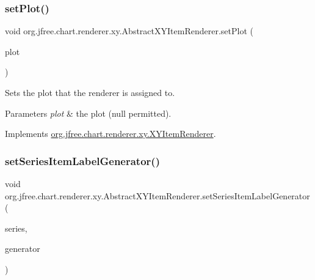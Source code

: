 \subsubsection{\texorpdfstring{set\+Plot()}{setPlot()}}
{\footnotesize\ttfamily void org.\+jfree.\+chart.\+renderer.\+xy.\+Abstract\+X\+Y\+Item\+Renderer.\+set\+Plot (\begin{DoxyParamCaption}\item[{\mbox{\hyperlink{classorg_1_1jfree_1_1chart_1_1plot_1_1_x_y_plot}{X\+Y\+Plot}}}]{plot }\end{DoxyParamCaption})}

Sets the plot that the renderer is assigned to.


\begin{DoxyParams}{Parameters}
{\em plot} & the plot ({\ttfamily null} permitted). \\
\hline
\end{DoxyParams}


Implements \mbox{\hyperlink{interfaceorg_1_1jfree_1_1chart_1_1renderer_1_1xy_1_1_x_y_item_renderer_a731979b292728dcb13c9041df3f713f5}{org.\+jfree.\+chart.\+renderer.\+xy.\+X\+Y\+Item\+Renderer}}.

\mbox{\label{classorg_1_1jfree_1_1chart_1_1renderer_1_1xy_1_1_abstract_x_y_item_renderer_aaa4e921655f5d328755f03806ce2c806}} 
\subsubsection{\texorpdfstring{set\+Series\+Item\+Label\+Generator()}{setSeriesItemLabelGenerator()}}
{\footnotesize\ttfamily void org.\+jfree.\+chart.\+renderer.\+xy.\+Abstract\+X\+Y\+Item\+Renderer.\+set\+Series\+Item\+Label\+Generator (\begin{DoxyParamCaption}\item[{int}]{series,  }\item[{\mbox{\hyperlink{interfaceorg_1_1jfree_1_1chart_1_1labels_1_1_x_y_item_label_generator}{X\+Y\+Item\+Label\+Generator}}}]{generator }\end{DoxyParamCaption})}

